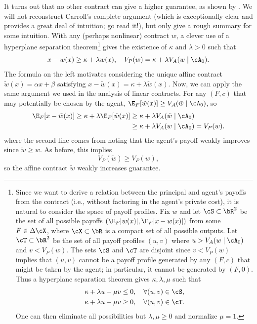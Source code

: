 It turns out that no other contract can give a higher guarantee, as shown by \textcite{carroll2015RobustnessLinear}.
We will not reconstruct Carroll's complete argument (which is exceptionally clear and provides a great deal of intuition; go read it!), but only give a rough summary for some intuition.
With any (perhaps nonlinear) contract \(w\), a clever use of a hyperplane separation theorem\footnote{
  Since we want to derive a relation between the principal and agent's payoffs from the contract (i.e., without factoring in the agent's private cost), it is natural to consider the space of payoff profiles.
  Fix \(w\) and let \(\cS \subset \bR^2\) be the set of all possible payoffs \(\left( \E_F[w(x)], \E_F[x - w(x)] \right)\) from some \(F \in \Delta \cX\), where \(\cX \subset \bR\) is a compact set of all possible outputs.
  Let \(\cT \subset \bR^2\) be the set of all payoff profiles \((u, v)\) where \(u  > V_A(w \mid \cA_0)\) and \(v < V_P(w)\).
  The sets \(\cS\) and \(\cT\) are disjoint since \(v < V_P(w)\) implies that \((u, v)\) cannot be a payoff profile generated by any \((F, c)\) that might be taken by the agent; in particular, it cannot be generated by \((F, 0)\).
  Thus a hyperplane separation theorem gives \(\kappa, \lambda, \mu\) such that
  \begin{align*}
    \kappa + \lambda u - \mu v &\leq 0 , \quad \forall (u, v) \in \cS, \\
    \kappa + \lambda u - \mu v &\geq 0 , \quad \forall (u, v) \in \cT.
  \end{align*}
  One can then eliminate all possibilities but \(\lambda, \mu \geq 0\) and normalize \(\mu = 1\).
} gives the existence of \(\kappa\) and \(\lambda > 0\) such that
\[
  x - w(x) \geq \kappa + \lambda w(x), \quad
  V_P(w) = \kappa + \lambda V_A(w \mid \cA_0).
\]
The formula on the left motivates considering the unique affine contract \(\tilde{w}(x) = \alpha x + \beta\) satisfying \(x - \tilde{w}(x) = \kappa + \lambda \tilde{w}(x)\).
Now, we can apply the same argument we used in the analysis of linear contracts.
For any \((F, c)\) that may potentially be chosen by the agent, \(\E_F[\tilde{w}(x)] \geq V_A(\tilde{w} \mid \cA_0)\), so
\begin{align*}
  \E_F[x - \tilde{w}(x)]
  \geq \kappa + \lambda \E_F[\tilde{w}(x)]
  &\geq \kappa + \lambda V_A(\tilde{w} \mid \cA_0) \\
  &\geq \kappa + \lambda V_A(w \mid \cA_0)
  = V_P(w).
\end{align*}
where the second line comes from noting that the agent's payoff weakly improves since \(\tilde{w} \geq w\).
As before, this implies
\[
  V_P(\tilde{w})
  \geq V_P(w),
\]
so the affine contract \(\tilde{w}\) weakly increases guarantee.

